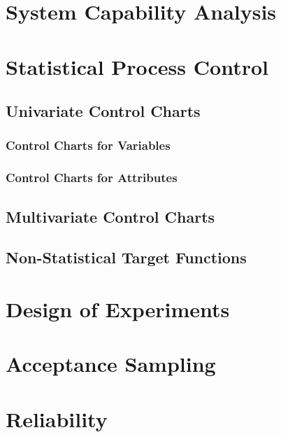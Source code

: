 \documentclass[12pt,a4paper]{report}
\begin{document}
\chapter{System Capability Analysis}




\chapter{Statistical Process Control}
\section{Univariate Control Charts}
\subsection{Control Charts for Variables}
\subsection{Control Charts for Attributes}



\section{Multivariate Control Charts}


\section{Non-Statistical Target Functions}



\chapter{Design of Experiments}


\chapter{Acceptance Sampling}


\chapter{Reliability}


\newpage

\appendix







\newpage
{}


%
\label{sec:bibliography}
\end{document}

